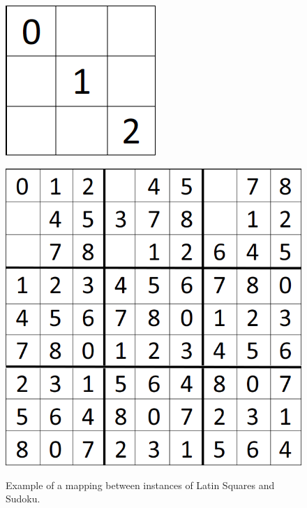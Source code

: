 \documentclass[runningheads,a4paper]{llncs}
\begin{document}
\begin{figure}[H]
\begin{minipage}{0.45\textwidth}
\includegraphics[scale=0.25]{sudoku-3.png}
\label{fig:partialNP}
\end{minipage}
\hfill
\begin{minipage}{0.45\textwidth}
\centering
\label{fig:partialLS}
\includegraphics[scale=0.25]{sudoku-1.png}
\end{minipage}
\caption{Example of a mapping between instances of Latin Squares and Sudoku.}
\end{figure}
\end{document}
